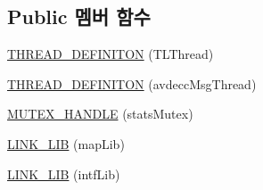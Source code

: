\subsection*{Public 멤버 함수}
\begin{DoxyCompactItemize}
\item 
\hyperlink{structtl__state__t_abedb2633a398e31e16a4b49ad5252142}{T\+H\+R\+E\+A\+D\+\_\+\+D\+E\+F\+I\+N\+I\+T\+ON} (T\+L\+Thread)
\item 
\hyperlink{structtl__state__t_af17690673e8d94ba37f617234852c94d}{T\+H\+R\+E\+A\+D\+\_\+\+D\+E\+F\+I\+N\+I\+T\+ON} (avdecc\+Msg\+Thread)
\item 
\hyperlink{structtl__state__t_ab34eb0a852b7e4a3ba3c259831c24706}{M\+U\+T\+E\+X\+\_\+\+H\+A\+N\+D\+LE} (stats\+Mutex)
\item 
\hyperlink{structtl__state__t_a3aa6d6c1c477c54fbdf8628559980c90}{L\+I\+N\+K\+\_\+\+L\+IB} (map\+Lib)
\item 
\hyperlink{structtl__state__t_a3dda752df605494ffedd878a4ffd0011}{L\+I\+N\+K\+\_\+\+L\+IB} (intf\+Lib)
\end{DoxyCompactItemize}
